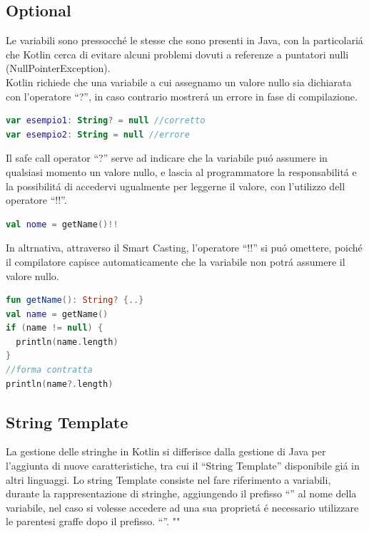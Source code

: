 \subsection{Optional}

Le variabili sono pressocch\'e le stesse che sono presenti in Java, con la particolari\'a che Kotlin cerca di evitare alcuni problemi dovuti a referenze a puntatori nulli (NullPointerException). \\
Kotlin richiede che una variabile a cui assegnamo un valore nullo sia dichiarata con l'operatore ``?'', in caso contrario mostrer\'a un errore in fase di compilazione.

\begin{lstlisting}[language=kotlin,caption={Esempio}]
var esempio1: String? = null //corretto
var esempio2: String = null //errore
\end{lstlisting}

Il safe call operator ``?'' serve ad indicare che la variabile pu\'o assumere in qualsiasi momento un valore nullo, e lascia al programmatore la responsabilit\'a e la possibilit\'a di accedervi ugualmente per leggerne il valore, con l'utilizzo dell operatore ``!!''.


\begin{lstlisting}[language=kotlin,caption={Esempio !!}]
val nome = getName()!!
\end{lstlisting}

In altrnativa, attraverso il Smart Casting, l'operatore ``!!'' si pu\'o omettere, poich\'e il compilatore capisce automaticamente che la variabile non potr\'a assumere il valore nullo.

\begin{lstlisting}[language=kotlin,caption={Smart Casting}]
fun getName(): String? {..}
val name = getName()
if (name != null) {
  println(name.length)
}
//forma contratta
println(name?.length)
\end{lstlisting}

\subsection{String Template}
La gestione delle stringhe in Kotlin si differisce dalla gestione di Java per l'aggiunta di nuove caratteristiche, tra cui il ``String Template'' disponibile gi\'a in altri linguaggi.
Lo string Template consiste nel fare riferimento a variabili, durante la rappresentazione di stringhe, aggiungendo il prefisso  ``\textdollar'' al nome della variabile, nel caso si volesse accedere ad una sua propriet\'a \'e necessario utilizzare le parentesi graffe dopo il prefisso. ``\textdollar''.
""

